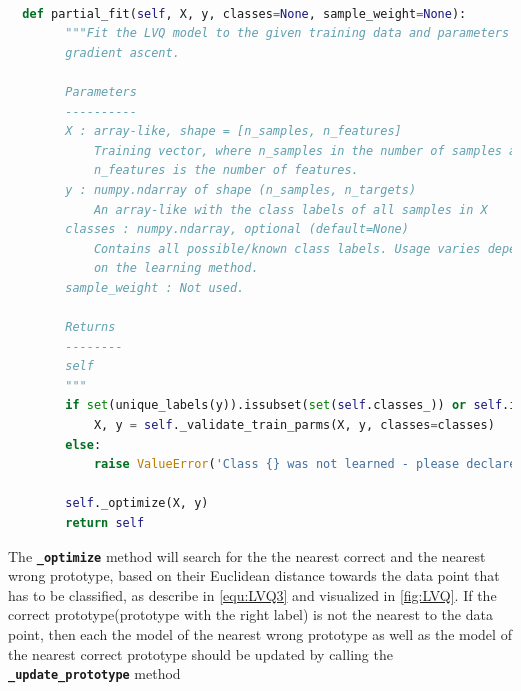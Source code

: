 \documentclass[12pt,oneside,a4paper,parskip]{scrbook}
\begin{document}
\begin{lstlisting}[label=lst:partialfit,
  language=python,
  firstnumber=1,
  caption=Method \texttt{partial\_fit} from the scikit-multiflow framework]			   

  def partial_fit(self, X, y, classes=None, sample_weight=None):
        """Fit the LVQ model to the given training data and parameters using
        gradient ascent.

        Parameters
        ----------
        X : array-like, shape = [n_samples, n_features]
            Training vector, where n_samples in the number of samples and
            n_features is the number of features.
        y : numpy.ndarray of shape (n_samples, n_targets)
            An array-like with the class labels of all samples in X
        classes : numpy.ndarray, optional (default=None)
            Contains all possible/known class labels. Usage varies depending
            on the learning method.
        sample_weight : Not used.

        Returns
        --------
        self
        """
        if set(unique_labels(y)).issubset(set(self.classes_)) or self.initial_fit is True:
            X, y = self._validate_train_parms(X, y, classes=classes)
        else:
            raise ValueError('Class {} was not learned - please declare all classes in first call of fit/partial_fit'.format(y))

        self._optimize(X, y)
        return self
\end{lstlisting}

The \textbf{\texttt{\_optimize}} method will search for the the nearest correct and the nearest wrong prototype, based on 
their Euclidean distance towards the data point that has to be classified, as describe in \ref{equ:LVQ3} and visualized in \ref{fig:LVQ}.
If the correct prototype(prototype with the right label) is not the nearest to the data point, then each the model of the nearest wrong
prototype as well as the model of the nearest correct prototype should be updated by calling the \textbf{\texttt{\_update\_prototype}} method
\end{document}
